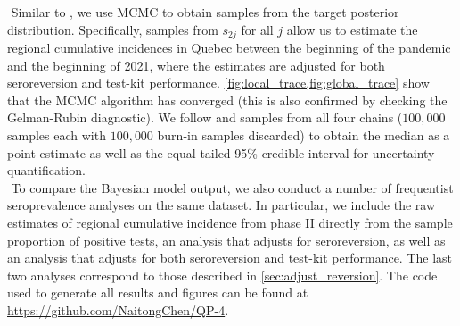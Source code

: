 \newline$ $
Similar to \cite{meyer2022adjusting}, we use MCMC to obtain samples from the target posterior distribution. Specifically, samples from $s_{2j}$ for all $j$ allow us to estimate the regional cumulative incidences in Quebec between the beginning of the pandemic and the beginning of 2021, where the estimates are adjusted for both seroreversion and test-kit performance. \cref{fig:local_trace,fig:global_trace} show that the MCMC algorithm has converged (this is also confirmed by checking the Gelman-Rubin diagnostic). We follow \cite{meyer2022adjusting} and samples from all four chains ($100,000$ samples each with $100,000$ burn-in samples discarded) to obtain the median as a point estimate as well as the equal-tailed 95\% credible interval for uncertainty quantification.\\
\newline$ $
To compare the Bayesian model output, we also conduct a number of frequentist seroprevalence analyses on the same dataset. In particular, we include the raw estimates of regional cumulative incidence from phase II directly from the sample proportion of positive tests, an analysis that adjusts for seroreversion, as well as an analysis that adjusts for both seroreversion and test-kit performance. The last two analyses correspond to those described in \cref{sec:adjust_reversion}. The code used to generate all results and figures can be found at \url{https://github.com/NaitongChen/QP-4}.

